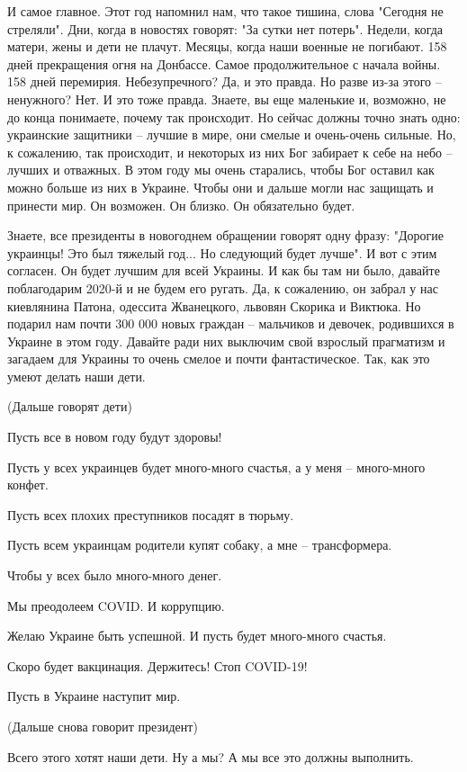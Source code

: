 И самое главное. Этот год напомнил нам, что такое тишина, слова "Сегодня не
стреляли". Дни, когда в новостях говорят: "За сутки нет потерь".  Недели, когда
матери, жены и дети не плачут. Месяцы, когда наши военные не погибают. 158 дней
прекращения огня на Донбассе. Самое продолжительное с начала войны. 158 дней
перемирия. Небезупречного? Да, и это правда. Но разве из-за этого – ненужного?
Нет. И это тоже правда. Знаете, вы еще маленькие и, возможно, не до конца
понимаете, почему так происходит. Но сейчас должны точно знать одно: украинские
защитники – лучшие в мире, они смелые и очень-очень сильные. Но, к сожалению,
так происходит, и некоторых из них Бог забирает к себе на небо – лучших и
отважных. В этом году мы очень старались, чтобы Бог оставил как можно больше из
них в Украине.  Чтобы они и дальше могли нас защищать и принести мир. Он
возможен. Он близко. Он обязательно будет.

Знаете, все президенты в новогоднем обращении говорят одну фразу: "Дорогие
украинцы! Это был тяжелый год... Но следующий будет лучше". И вот с этим
согласен. Он будет лучшим для всей Украины. И как бы там ни было, давайте
поблагодарим 2020-й и не будем его ругать. Да, к сожалению, он забрал у нас
киевлянина Патона, одессита Жванецкого, львовян Скорика и Виктюка. Но подарил
нам почти 300 000 новых граждан – мальчиков и девочек, родившихся в Украине в
этом году. Давайте ради них выключим свой взрослый прагматизм и загадаем для
Украины то очень смелое и почти фантастическое. Так, как это умеют делать наши
дети.

(Дальше говорят дети)

Пусть все в новом году будут здоровы!

Пусть у всех украинцев будет много-много счастья, а у меня – много-много
конфет.

Пусть всех плохих преступников посадят в тюрьму.

Пусть всем украинцам родители купят собаку, а мне – трансформера.

Чтобы у всех было много-много денег.

Мы преодолеем COVID. И коррупцию.

Желаю Украине быть успешной. И пусть будет много-много счастья.

Скоро будет вакцинация. Держитесь! Стоп COVID-19!

Пусть в Украине наступит мир.

(Дальше снова говорит президент)

Всего этого хотят наши дети. Ну а мы? А мы все это должны выполнить.


